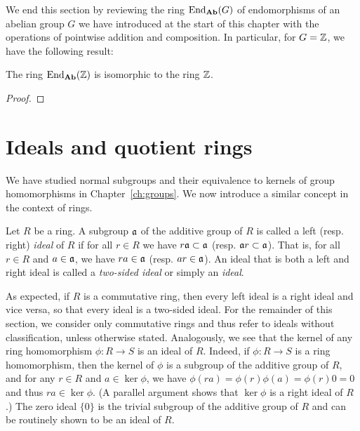 \bigskip

We end this section by reviewing the ring \(\operatorname{End}_{\mathbf{Ab}}(G)\) of endomorphisms of
an abelian group \(G\) we have introduced at the start of this chapter with the
operations of pointwise addition and composition. In particular, for \(G = \mathbb{Z}\),
we have the following result:

\begin{theorem}
    The ring \(\operatorname{End}_{\mathbf{Ab}}(\mathbb{Z})\) is isomorphic to the ring \(\mathbb{Z}\).
\end{theorem}

\begin{proof}
    
\end{proof}

\section{Ideals and quotient rings}
\label{sec:ideals}

We have studied normal subgroups and their equivalence to kernels of group
homomorphisms in Chapter~\ref{ch:groups}. We now introduce a similar concept in
the context of rings.

\begin{definition}[Ideal]
    \label{def:ideal}
    Let \(R\) be a ring. A subgroup \(\mathfrak{a}\) of the additive group of \(R\)
    is called a left (resp. right) \emph{ideal} of \(R\) if for all \(r \in R\)
    we have \(r\mathfrak{a} \subset \mathfrak{a}\) (resp. \(\mathfrak{a}r \subset \mathfrak{a}\)).
    That is, for all \(r \in R\) and \(a \in \mathfrak{a}\), we have \(ra \in
    \mathfrak{a}\) (resp. \(ar \in \mathfrak{a}\)). An ideal that is both a left and right
    ideal is called a \emph{two-sided ideal} or simply an \emph{ideal}.
\end{definition}

As expected, if \(R\) is a commutative ring, then every left ideal is a right
ideal and vice versa, so that every ideal is a two-sided ideal. For the
remainder of this section, we consider only commutative rings and thus refer to
ideals without classification, unless otherwise stated. Analogously, we see that
the kernel of any ring homomorphism \(\phi: R \to S\) is an ideal of \(R\).
Indeed, if \(\phi: R \to S\) is a ring homomorphism, then the kernel of \(\phi\)
is a subgroup of the additive group of \(R\), and for any \(r \in R\) and \(a
\in \ker \phi\), we have \(\phi(ra) = \phi(r)\phi(a) = \phi(r)0 = 0\) and thus
\(ra \in \ker \phi\). (A parallel argument shows that \(\ker \phi\) is a right
ideal of \(R\).) The zero ideal \(\{0\}\) is the trivial subgroup of the
additive group of \(R\) and can be routinely shown to be an ideal of \(R\).


